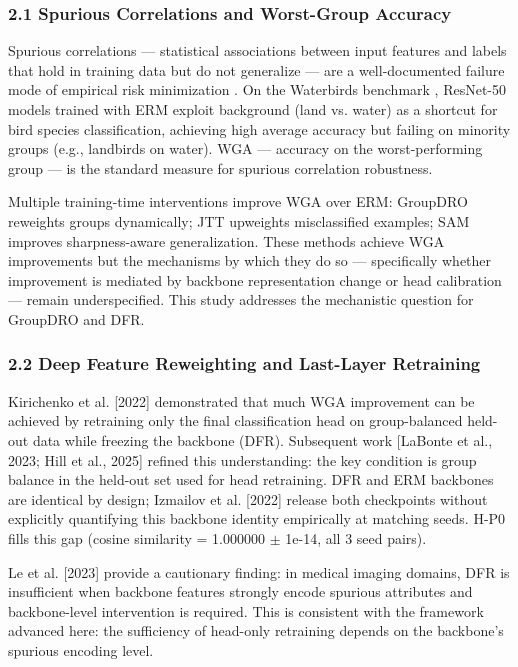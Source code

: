 
\subsubsection{2.1 Spurious Correlations and Worst-Group Accuracy}

Spurious correlations --- statistical associations between input features and labels that hold in training data but do not generalize --- are a well-documented failure mode of empirical risk minimization \citep{sagawa2019distributionally}. On the Waterbirds benchmark \citep{sagawa2019distributionally}, ResNet-50 models trained with ERM exploit background (land vs. water) as a shortcut for bird species classification, achieving high average accuracy but failing on minority groups (e.g., landbirds on water). WGA --- accuracy on the worst-performing group --- is the standard measure for spurious correlation robustness.

Multiple training-time interventions improve WGA over ERM: GroupDRO \citep{sagawa2019distributionally} reweights groups dynamically; JTT \citep{Liu2021} upweights misclassified examples; SAM \citep{foret2021sharpness} improves sharpness-aware generalization. These methods achieve WGA improvements but the mechanisms by which they do so --- specifically whether improvement is mediated by backbone representation change or head calibration --- remain underspecified. This study addresses the mechanistic question for GroupDRO and DFR.

\subsubsection{2.2 Deep Feature Reweighting and Last-Layer Retraining}

Kirichenko et al. [2022] demonstrated that much WGA improvement can be achieved by retraining only the final classification head on group-balanced held-out data while freezing the backbone (DFR). Subsequent work [LaBonte et al., 2023; Hill et al., 2025] refined this understanding: the key condition is group balance in the held-out set used for head retraining. DFR and ERM backbones are identical by design; Izmailov et al. [2022] release both checkpoints without explicitly quantifying this backbone identity empirically at matching seeds. H-P0 fills this gap (cosine similarity = 1.000000 $\pm$ 1e-14, all 3 seed pairs).

Le et al. [2023] provide a cautionary finding: in medical imaging domains, DFR is insufficient when backbone features strongly encode spurious attributes and backbone-level intervention is required. This is consistent with the framework advanced here: the sufficiency of head-only retraining depends on the backbone's spurious encoding level.

